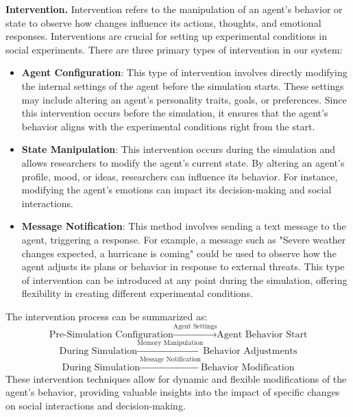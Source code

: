 \textbf{Intervention.} Intervention refers to the manipulation of an agent’s behavior or state to observe how changes influence its actions, thoughts, and emotional responses. Interventions are crucial for setting up experimental conditions in social experiments. There are three primary types of intervention in our system:

\begin{itemize}
    \item \textbf{Agent Configuration}: This type of intervention involves directly modifying the internal settings of the agent before the simulation starts. These settings may include altering an agent's personality traits, goals, or preferences. Since this intervention occurs before the simulation, it ensures that the agent’s behavior aligns with the experimental conditions right from the start.
    \item \textbf{State Manipulation}: This intervention occurs during the simulation and allows researchers to modify the agent’s current state. By altering an agent's profile, mood, or ideas, researchers can influence its behavior. For instance, modifying the agent’s emotions can impact its decision-making and social interactions.
    \item \textbf{Message Notification}: This method involves sending a text message to the agent, triggering a response. For example, a message such as "Severe weather changes expected, a hurricane is coming" could be used to observe how the agent adjusts its plans or behavior in response to external threats. This type of intervention can be introduced at any point during the simulation, offering flexibility in creating different experimental conditions.
\end{itemize}

The intervention process can be summarized as:
\[
\text{Pre-Simulation Configuration} \xrightarrow{\text{Agent Settings}} \text{Agent Behavior Start}
\]
\[
\text{During Simulation} \xrightarrow{\text{Memory Manipulation}} \text{Behavior Adjustments}
\]
\[
\text{During Simulation} \xrightarrow{\text{Message Notification}} \text{Behavior Modification}
\]
These intervention techniques allow for dynamic and flexible modifications of the agent’s behavior, providing valuable insights into the impact of specific changes on social interactions and decision-making.

